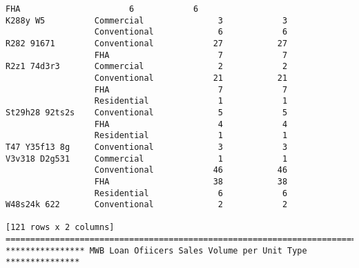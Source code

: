 \documentclass[11pt]{article}
\begin{document}
\begin{Verbatim}[commandchars=\\\{\}]
                  FHA                      6            6
K288y W5          Commercial               3            3
                  Conventional             6            6
R282 91671        Conventional            27           27
                  FHA                      7            7
R2z1 74d3r3       Commercial               2            2
                  Conventional            21           21
                  FHA                      7            7
                  Residential              1            1
St29h28 92ts2s    Conventional             5            5
                  FHA                      4            4
                  Residential              1            1
T47 Y35f13 8g     Conventional             3            3
V3v318 D2g531     Commercial               1            1
                  Conventional            46           46
                  FHA                     38           38
                  Residential              6            6
W48s24k 622       Conventional             2            2

[121 rows x 2 columns]
==============================================================================
**************** MWB Loan Ofiicers Sales Volume per Unit Type ***************
 

\end{Verbatim}
\end{document}
